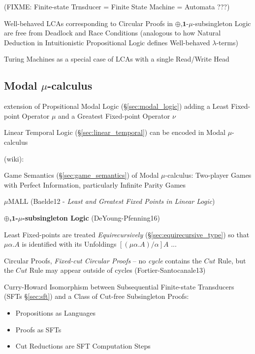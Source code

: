 (FIXME: Finite-state Trnsducer = Finite State Machine = Automata ???)

Well-behaved LCAs corresponding to Circular Proofs in
$\oplus$,$\mathbf{1}$-$\mu$-subsingleton Logic are free from Deadlock
and Race Conditions (analogous to how Natural Deduction in
Intuitionistic Propositional Logic defines Well-behaved
$\lambda$-terms)

Turing Machines as a special case of LCAs with a single Read/Write
Head


\asterism


\subsection{Modal $\mu$-calculus}\label{sec:modal_mu_logic}

extension of Propsitional Modal Logic (\S\ref{sec:modal_logic}) adding
a Least Fixed-point Operator $\mu$ and a Greatest Fixed-point Operator
$\nu$

\fist Linear Temporal Logic (\S\ref{sec:linear_temporal}) can be
encoded in Modal $\mu$-calculus

(wiki):

Game Semantics (\S\ref{sec:game_semantics}) of Modal $\mu$-calculus:
Two-player Games with Perfect Information, particularly Infinite
Parity Games

\asterism

$\mu$MALL (Baelde12 - \emph{Least and Greatest Fixed Points in Linear
  Logic})

\asterism

\textbf{$\oplus$,$\mathbf{1}$-$\mu$-subsingleton Logic}
(DeYoung-Pfenning16)

Least Fixed-points are treated \emph{Equirecursively}
(\S\ref{sec:equirecursive_type}) so that $\mu\alpha.A$ is identified
with its Unfoldings $[(\mu\alpha.A)/\alpha]A$ ...

Circular Proofs, \emph{Fixed-cut Circular Proofs} -- no \emph{cycle}
contains the $Cut$ Rule, but the $Cut$ Rule may appear outside of
cycles (Fortier-Santocanale13)

Curry-Howard Isomorphism between Subsequential Finite-state
Transducers (SFTs \S\ref{sec:sft}) and a Class of Cut-free
Subsingleton Proofs:
\begin{itemize}
  \item Propositions as Languages
  \item Proofs as SFTs
  \item Cut Reductions are SFT Computation Steps
\end{itemize}

